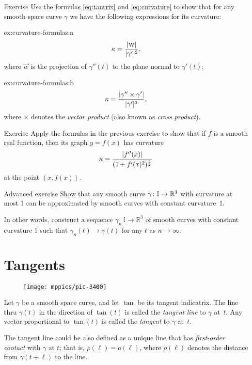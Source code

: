 \begin{thm}{Exercise}\label{ex:curvature-formulas}
Use the formulas \ref{eq:tantrix} and \ref{eq:curvature} to show that 
for any smooth space curve $\gamma$ we have the following expressions for its curvature:
\setlength{\columnseprule}{0.4pt}
\begin{multicols}{2}

\begin{subthm}{ex:curvature-formulas:a} 
\[\kappa=\frac{|\text{\sc{w}}|}{|\gamma'|^2},\]
where $\vec w$ is the projection of $\gamma''(t)$ to the plane normal to $\gamma'(t)$;
\end{subthm}

\begin{subthm}{ex:curvature-formulas:b}
\[\kappa=\frac{|\gamma''\times \gamma'|}{|\gamma'|^{3}},\]
where $\times$ denotes the {}\emph{vector product} (also known as {}\emph{cross product}).
\end{subthm}
\end{multicols}
\end{thm}


\begin{thm}{Exercise}\label{ex:curvature-graph}
Apply the formulas in the previous exercise to show that if $f$ is a smooth real function,
then its graph $y=f(x)$  has curvature
\[\kappa=\frac{|f''(x)|}{(1+f'(x)^2)^{\frac32}}\]
at the point $(x,f(x))$.
\end{thm}

\begin{thm}{Advanced exercise}\label{ex:approximation-const-curvature}
Show that any smooth curve $\gamma\:\mathbb{I}\z\to\mathbb{R}^3$ with curvature at most 1 can be approximated by smooth curves with constant curvature~1.

In other words, construct a sequence $\gamma_n\:\mathbb{I}\to\mathbb{R}^3$ of smooth curves  with constant curvature 1 such that $\gamma_n(t)\to \gamma(t)$ for any $t$ as $n\to\infty$.
\end{thm}

\section{Tangents}

{

\begin{wrapfigure}{r}{32 mm}
\vskip-10mm
\centering
\texttt{[image: mppics/pic-3400]}
\vskip0mm
\end{wrapfigure}

Let $\gamma$ be a smooth space curve, and let $\tan$ be its tangent indicatrix.
The line thru $\gamma(t)$ in the direction of $\tan(t)$ is called the \emph{tangent line} to $\gamma$  at~$t$.
Any vector proportional to $\tan(t)$ is called the \emph{tangent} to $\gamma$ at~$t$.

The tangent line could be also defined as a unique line that has \emph{first-order contact} with $\gamma$ at $t$;
that is, $\rho(\ell)=o(\ell)$, where $\rho(\ell)$ denotes the distance from $\gamma(t+\ell)$ to the line.

}

